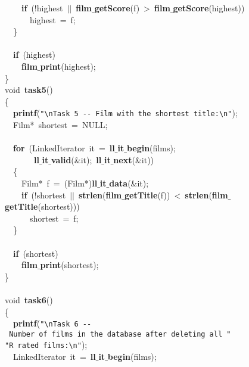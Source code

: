 \documentclass{article}
\begin{document}
\mbox{}\ \ \ \ \textbf{if}\ (!highest\ $|$$|$\ \textbf{film$\_$getScore}(f)\ \textgreater{}\ \textbf{film$\_$getScore}(highest)) \\
\mbox{}\ \ \ \ \ \ highest\ =\ f; \\
\mbox{}\ \ \} \\
\mbox{} \\
\mbox{}\ \ \textbf{if}\ (highest) \\
\mbox{}\ \ \ \ \textbf{film$\_$print}(highest); \\
\mbox{}\} \\
\mbox{}void\ \textbf{task5}() \\
\mbox{}\{ \\
\mbox{}\ \ \textbf{printf}(\texttt{"{}}\texttt{\textbackslash{}n}\texttt{Task\ 5\ -\/-\ Film\ with\ the\ shortest\ title:}\texttt{\textbackslash{}n}\texttt{"{}}); \\
\mbox{}\ \ Film*\ shortest\ =\ NULL; \\
\mbox{} \\
\mbox{}\ \ \textbf{for}\ (LinkedIterator\ it\ =\ \textbf{ll$\_$it$\_$begin}(films); \\
\mbox{}\ \ \ \ \ \ \ \textbf{ll$\_$it$\_$valid}(\&it);\ \textbf{ll$\_$it$\_$next}(\&it)) \\
\mbox{}\ \ \{ \\
\mbox{}\ \ \ \ Film*\ f\ =\ (Film*)\textbf{ll$\_$it$\_$data}(\&it); \\
\mbox{}\ \ \ \ \textbf{if}\ (!shortest\ $|$$|$\ \textbf{strlen}(\textbf{film$\_$getTitle}(f))\ \textless{}\ \textbf{strlen}(\textbf{film$\_$getTitle}(shortest))) \\
\mbox{}\ \ \ \ \ \ shortest\ =\ f; \\
\mbox{}\ \ \} \\
\mbox{} \\
\mbox{}\ \ \textbf{if}\ (shortest) \\
\mbox{}\ \ \ \ \textbf{film$\_$print}(shortest); \\
\mbox{}\} \\
\mbox{} \\
\mbox{}void\ \textbf{task6}() \\
\mbox{}\{ \\
\mbox{}\ \ \textbf{printf}(\texttt{"{}}\texttt{\textbackslash{}n}\texttt{Task\ 6\ -\/-\ Number\ of\ films\ in\ the\ database\ after\ deleting\ all\ "{}} \\
\mbox{}\texttt{"{}R\ rated\ films:}\texttt{\textbackslash{}n}\texttt{"{}}); \\
\mbox{}\ \ LinkedIterator\ it\ =\ \textbf{ll$\_$it$\_$begin}(films); \\
\end{document}
